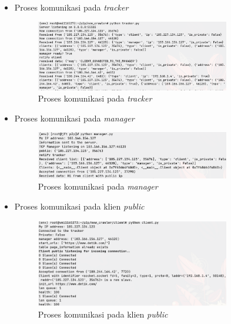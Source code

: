 \begin{itemize}
	\item{Proses komunikasi pada \emph{tracker}}
	\begin{figure}[H]
		\centering{}
		\includegraphics[width=0.8\textwidth]{gambar/kode/uji_tracker}
		\caption{Proses komunikasi pada \emph{tracker}}
	\end{figure}

	\item{Proses komunikasi pada \emph{manager}}
	\begin{figure}[H]
		\centering{}
		\includegraphics[width=0.8\textwidth]{gambar/kode/uji_manager}
		\caption{Proses komunikasi pada \emph{manager}}
	\end{figure}

	\item{Proses komunikasi pada klien \emph{public}}
	\begin{figure}[H]
		\centering{}
		\includegraphics[width=0.8\textwidth]{gambar/kode/uji_client_public}
		\caption{Proses komunikasi pada klien \emph{public}}
	\end{figure}


\end{itemize}
